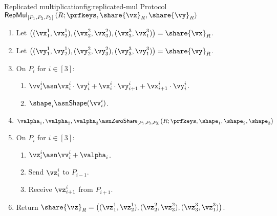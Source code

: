 \begin{Boxfig}{Replicated multiplication}{fig:replicated-mul}
  {Protocol $\mathsf{RepMul}_{[P_1, P_2, P_3]}\left( R; \prfkeys, \share{\vx}_R, \share{\vy}_R \right)$}
  \begin{enumerate}
  \item Let $\left( (\vx_1^1, \vx_2^1), (\vx_2^2, \vx_3^2), (\vx_3^3, \vx_1^3) \right) = \share{\vx}_R$.
  \item Let $\left( (\vy_1^1, \vy_2^1), (\vy_2^2, \vy_3^2), (\vy_3^3, \vy_1^3) \right) = \share{\vy}_R$.
  
  \item On $P_i$ for $i \in [3]$:
  \begin{enumerate}
    \item $\vv_i^i \asn \vx_i^i \cdot \vy_i^i + \vx_i^i \cdot \vy_{i+1}^i + \vx_{i+1}^i \cdot \vy_i^i$.
    \item $\shape_i \asn \mathsf{Shape}(\vv_i^i)$.
  \end{enumerate}

  \item $\valpha_1, \valpha_2, \valpha_3 \asn \mathsf{ZeroShare}_{[P_1, P_2, P_3]}\big( R; \prfkeys, \shape_1, \shape_2, \shape_3 \big)$

  \item On $P_i$ for $i \in [3]$:
  \begin{enumerate}
    \item $\vz_i^i \asn \vv_i^i + \valpha_i$.
    \item Send $\vz_i^i$ to $P_{i-1}$.
    \item Receive $\vz_{i+1}^i$ from $P_{i+1}$.
  \end{enumerate}

  \item Return $\share{\vz}_R = \left( (\vz_1^1, \vz_2^1), (\vz_2^2, \vz_3^2), (\vz_3^3, \vz_1^3) \right)$.
  \end{enumerate}
\end{Boxfig}


